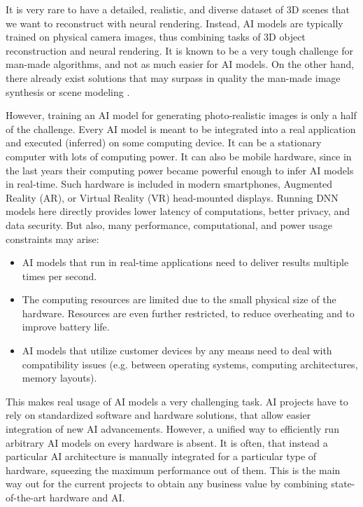 It is very rare to have a detailed, realistic, and diverse dataset of 3D scenes that we want to reconstruct with neural rendering. Instead, AI models are typically trained on physical camera images, thus combining tasks of 3D object reconstruction and neural rendering. It is known to be a very tough challenge for man-made algorithms, and not as much easier for AI models. On the other hand, there already exist solutions that may surpass in quality the man-made image synthesis or scene modeling \cite{dnn:stylegan-v1-19,dnn:stylegan-v2-20,dnn:stylegan-v3-21,dnn:nerf20}.
 
However, training an AI model for generating photo-realistic images is only a half of the challenge. Every AI model is meant to be integrated into a real application and executed (inferred) on some computing device. It can be a stationary computer with lots of computing power. It can also be mobile hardware, since in the last years their computing power became powerful enough to infer AI models in real-time. Such hardware is included in modern smartphones, Augmented Reality (AR), or Virtual Reality (VR) head-mounted displays. Running DNN models here directly provides lower latency of computations, better privacy, and data security. But also, many performance, computational, and power usage constraints may arise:
\begin{itemize}
	\item  AI models that run in real-time applications need to deliver results multiple times per second.
	\item  The computing resources are limited due to the small physical size of the hardware. Resources are even further restricted, to reduce overheating and to improve battery life.
	\item  AI models that utilize customer devices by any means need to deal with compatibility issues (e.g. between operating systems, computing architectures, memory layouts).
\end{itemize}

This makes real usage of AI models a very challenging task. AI projects have to rely on standardized software and hardware solutions, that allow easier integration of new AI advancements. However, a unified way to efficiently run arbitrary AI models on every hardware is absent. It is often, that instead a particular AI architecture is manually integrated for a particular type of hardware, squeezing the maximum performance out of them. This is the main way out for the current projects to obtain any business value by  combining state-of-the-art hardware and AI.
 

